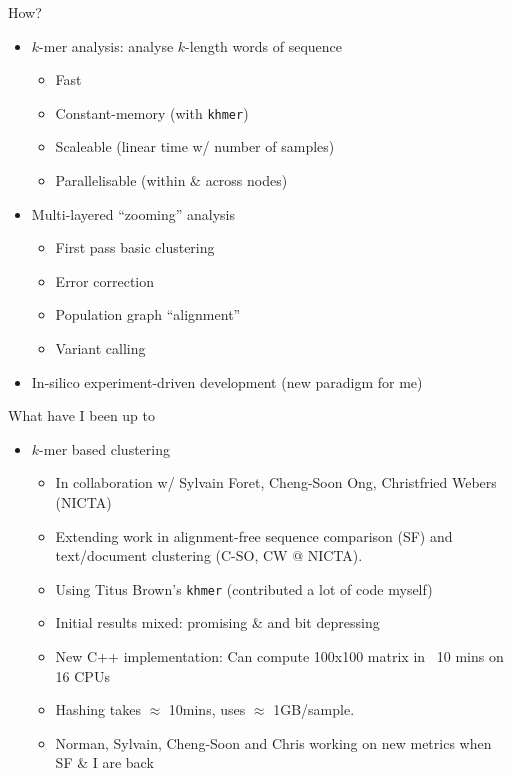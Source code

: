 \documentclass[t]{beamer}
\begin{document}
\begin{frame}{How?}
  \begin{itemize}
    \item $k$-mer analysis: analyse $k$-length words of sequence
    \begin{itemize}
      \item Fast
      \item Constant-memory (with \texttt{khmer})
      \item Scaleable (linear time w/ number of samples)
      \item Parallelisable (within \& across nodes)
    \end{itemize}
  \pause
    \item Multi-layered ``zooming'' analysis
      \begin{itemize}
        \item First pass basic clustering
        \item Error correction
        \item Population graph ``alignment''
        \item Variant calling
      \end{itemize}
  \pause
    \item In-silico experiment-driven development (new paradigm for me)
  \end{itemize}
\end{frame}

\begin{frame}{What have I been up to}
  \begin{itemize}
    \item $k$-mer based clustering
  \pause
    \begin{itemize}
      \item In collaboration w/ Sylvain Foret, Cheng-Soon Ong, Christfried
        Webers (NICTA)
  \pause
      \item Extending work in alignment-free sequence comparison (SF) and
        text/document clustering (C-SO, CW @ NICTA).
  \pause
      \item Using Titus Brown's \texttt{khmer} (contributed a lot of code
        myself)
  \pause
      \item Initial results mixed: promising \& and bit depressing
  \pause
      \item New C++ implementation: Can compute 100x100 matrix in ~10 mins on
        16 CPUs
      \item Hashing takes $\approx$ 10mins, uses $\approx$ 1GB/sample.
  \pause
      \item Norman, Sylvain, Cheng-Soon and Chris working on new metrics when
            SF \& I are back
    \end{itemize}
  \end{itemize}
\end{frame}
\end{document}
